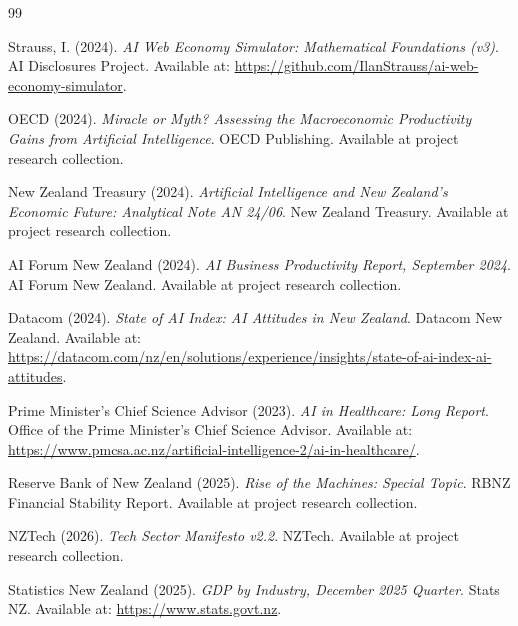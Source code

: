 \documentclass[11pt,a4paper]{article}
\begin{document}
\begin{thebibliography}{99}

Strauss, I. (2024). \textit{AI Web Economy Simulator: Mathematical Foundations (v3)}. AI Disclosures Project. Available at: \url{https://github.com/IlanStrauss/ai-web-economy-simulator}.

OECD (2024). \textit{Miracle or Myth? Assessing the Macroeconomic Productivity Gains from Artificial Intelligence}. OECD Publishing. Available at project research collection.

New Zealand Treasury (2024). \textit{Artificial Intelligence and New Zealand's Economic Future: Analytical Note AN 24/06}. New Zealand Treasury. Available at project research collection.

AI Forum New Zealand (2024). \textit{AI Business Productivity Report, September 2024}. AI Forum New Zealand. Available at project research collection.

Datacom (2024). \textit{State of AI Index: AI Attitudes in New Zealand}. Datacom New Zealand. Available at: \url{https://datacom.com/nz/en/solutions/experience/insights/state-of-ai-index-ai-attitudes}.

Prime Minister's Chief Science Advisor (2023). \textit{AI in Healthcare: Long Report}. Office of the Prime Minister's Chief Science Advisor. Available at: \url{https://www.pmcsa.ac.nz/artificial-intelligence-2/ai-in-healthcare/}.

Reserve Bank of New Zealand (2025). \textit{Rise of the Machines: Special Topic}. RBNZ Financial Stability Report. Available at project research collection.

NZTech (2026). \textit{Tech Sector Manifesto v2.2}. NZTech. Available at project research collection.

Statistics New Zealand (2025). \textit{GDP by Industry, December 2025 Quarter}. Stats NZ. Available at: \url{https://www.stats.govt.nz}.

\end{thebibliography}
\end{document}
